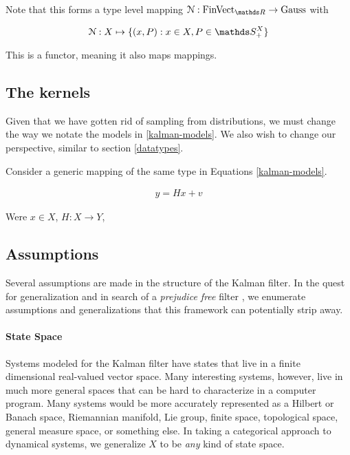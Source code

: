 Note that this forms a type level mapping $\gaussian : \FinVect \rightarrow \gausscat$ with

\begin{equation}
    \gaussian : X \mapsto \{(x,P) : x\in X, P \in \symmetric^X_+\}
\end{equation}

This is a functor, meaning it also maps mappings.

\subsection{The kernels}

Given that we have gotten rid of sampling from distributions, we must change the way we notate the models in \ref{kalman-models}. We also wish to change our perspective, similar to section \ref{datatypes}.

Consider a generic mapping of the same type in Equations \ref{kalman-models}.

\begin{gather}
	y = Hx + v
\end{gather}

Were $x\in X$, $H:X\rightarrow Y$, 

\subsection{Assumptions}

Several assumptions are made in the structure of the Kalman filter. In the quest for generalization and in search of a \emph{prejudice free} filter \cite{some-moriba-paper}, we enumerate assumptions and generalizations that this framework can potentially strip away.

\paragraph{State Space}

Systems modeled for the Kalman filter have states that live in a finite dimensional real-valued vector space. Many interesting systems, however, live in much more general spaces that can be hard to characterize in a computer program.  Many systems would be more accurately represented as a Hilbert or Banach space, Riemannian manifold, Lie group, finite space, topological space, general measure space, or something else. In taking a categorical approach to dynamical systems, we generalize $X$ to be \emph{any} kind of state space.

